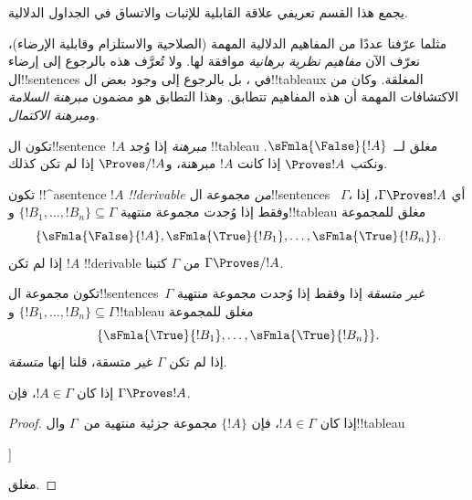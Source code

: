 \documentclass[../../../include/open-logic-section]{subfiles}
\begin{document}
      {}
      {}
      

\begin{editorial}
يجمع هذا القسم تعريفي علاقة القابلية للإثبات والاتساق في الجداول الدلالية.
\end{editorial}

\begin{explain}
مثلما عرّفنا عددًا من المفاهيم الدلالية المهمة (الصلاحية والاستلزام وقابلية
الإرضاء)، نعرّف الآن \emph{مفاهيم نظرية برهانية} موافقة لها. ولا تُعرَّف هذه
بالرجوع إلى إرضاء ال!!{sentence}s في
، بل بالرجوع إلى وجود بعض
ال!!{tableau}x المغلقة. وكان من الاكتشافات المهمة أن هذه المفاهيم تتطابق.
وهذا التطابق هو مضمون \emph{مبرهنة السلامة} و\emph{مبرهنة الاكتمال}.
\end{explain}


\begin{defn}[المبرهنات]
تكون ال!!{sentence}~$!A$ \emph{مبرهنة} إذا وُجد !!{tableau} مغلق
لــ~$\sFmla{\False}{!A}$. ونكتب $\Proves !A$ إذا كانت $!A$ مبرهنة،
و$\Proves/ !A$ إذا لم تكن كذلك.
\end{defn}

\begin{defn}[!!^{derivability}]
تكون !!^a{sentence} $!A$ \emph{!!{derivable} من} مجموعة ال!!{sentence}s
~$\Gamma$، أي $\Gamma \Proves !A$، إذا وفقط إذا وُجدت مجموعة منتهية
$\{!B_1, \dots, !B_n\} \subseteq \Gamma$ و!!{tableau} مغلق للمجموعة
\[
\{
  \sFmla{\False}{!A},
  \sFmla{\True}{!B_1}, \dots,
  \sFmla{\True}{!B_n}
  \}.
\]
إذا لم تكن $!A$ !!{derivable} من $\Gamma$ كتبنا $\Gamma \Proves/
!A$.
\end{defn}

\begin{defn}[الاتساق]
تكون مجموعة ال!!{sentence}s~$\Gamma$ \emph{غير متسقة} إذا وفقط إذا وُجدت
مجموعة منتهية $\{!B_1, \dots, !B_n\} \subseteq \Gamma$ و!!{tableau}
مغلق للمجموعة
\[
\{
  \sFmla{\True}{!B_1}, \dots,
  \sFmla{\True}{!B_n}  
  \}.
\]
إذا لم تكن $\Gamma$ غير متسقة، قلنا إنها \emph{متسقة}.
\end{defn}

\begin{prop}[الانعكاسية]
إذا كان $!A \in \Gamma$، فإن $\Gamma \Proves !A$.
\end{prop}

\begin{proof}
إذا كان $!A \in \Gamma$، فإن $\{!A\}$ مجموعة جزئية منتهية من~$\Gamma$ وال!!{tableau}
\begin{oltableau}
  [\sFmla{\False}{\formula{A}}, just = \TAss
    [\sFmla{\True}{\formula{A}}, just = \TAss,close]
  ]
\end{oltableau}
مغلق.
\end{proof}
  
\end{document}
